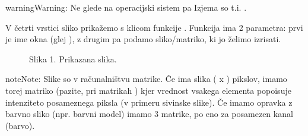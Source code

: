 \documentclass[letterpaper,10pt,english]{sphinxmanual}
\begin{document}
\begin{sphinxadmonition}{warning}{Warning:}
\sphinxAtStartPar
Ne glede na operacijski sistem pa  Izjema so t.i. .
\end{sphinxadmonition}

\begin{sphinxVerbatim}[commandchars=\\\{\}]
 
\end{sphinxVerbatim}

\sphinxAtStartPar
V četrti vrstici sliko prikažemo s klicom funkcije . Funkcija ima 2 parametra: prvi je ime okna (glej ), z drugim pa podamo sliko/matriko, ki jo želimo izrisati.

\begin{figure}[htbp]
\centering
\capstart

\noindent{}
\caption{Slika 1. Prikazana slika.}\label{\detokenize{uvod_py_opencv:id2}}\end{figure}

\begin{sphinxadmonition}{note}{Note:}
\sphinxAtStartPar
Slike so v računalništvu matrike. Če ima slika  ( x ) pikslov, imamo torej matriko  (pazite, pri matrikah ) kjer vrednost vsakega elementa popoisuje intenziteto posameznega piksla (v primeru sivinske \sphinxhyphen{}  slike). Če imamo opravka z barvno sliko (npr.  barvni model) imamo 3 matrike, po eno za posamezen kanal (barvo).
\end{sphinxadmonition}

\begin{sphinxVerbatim}[commandchars=\\\{\}]
\end{sphinxVerbatim}
\end{document}
